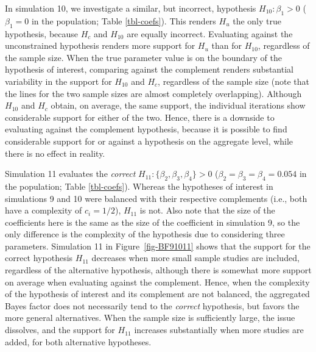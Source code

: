 \documentclass[
]{article}
\begin{document}
In simulation 10, we investigate a similar, but incorrect, hypothesis
\(H_{10}: \beta_1 > 0\) (\(\beta_{1}=0\) in the population; Table
\ref{tbl-coefs}). This renders \(H_u\) the only true hypothesis, because
\(H_c\) and \(H_{10}\) are equally incorrect. Evaluating against the
unconstrained hypothesis renders more support for \(H_u\) than for
\(H_{10}\), regardless of the sample size. When the true parameter value
is on the boundary of the hypothesis of interest, comparing against the
complement renders substantial variability in the support for \(H_{10}\)
and \(H_c\), regardless of the sample size (note that the lines for the
two sample sizes are almost completely overlapping). Although \(H_{10}\)
and \(H_c\) obtain, on average, the same support, the individual
iterations show considerable support for either of the two. Hence, there
is a downside to evaluating against the complement hypothesis, because
it is possible to find considerable support for or against a hypothesis
on the aggregate level, while there is no effect in reality.

Simulation 11 evaluates the \emph{correct}
\(H_{11}: \{\beta_2, \beta_3, \beta_4\} > 0\)
(\(\beta_2 = \beta_3 = \beta_4 = 0.054\) in the population; Table
\ref{tbl-coefs}). Whereas the hypotheses of interest in simulations 9
and 10 were balanced with their respective complements (i.e., both have
a complexity of \(c_i = 1/2\)), \(H_{11}\) is not. Also note that the
size of the coefficients here is the same as the size of the coefficient
in simulation 9, so the only difference is the complexity of the
hypothesis due to considering three parameters. Simulation 11 in
Figure~\ref{fig-BF91011} shows that the support for the correct
hypothesis \(H_{11}\) decreases when more small sample studies are
included, regardless of the alternative hypothesis, although there is
somewhat more support on average when evaluating against the complement.
Hence, when the complexity of the hypothesis of interest and its
complement are not balanced, the aggregated Bayes factor does not
necessarily tend to the \emph{correct} hypothesis, but favors the more
general alternatives. When the sample size is sufficiently large, the
issue dissolves, and the support for \(H_{11}\) increases substantially
when more studies are added, for both alternative hypotheses.
\end{document}
